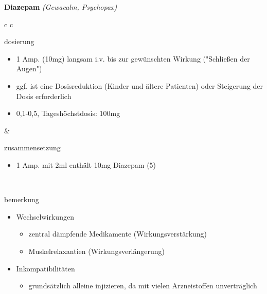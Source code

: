 \begin{frame}{
    \textbf{Diazepam}
    \textit{(Gewacalm, Psychopax)}
}
    \begin{tabular}{c c}
        \begin{beamercolorbox}[wd=\boxwidth\textwidth,ht=\boxheight\textheight,sep=1em]{dosierung}
            \begin{itemize}
                \item 1 Amp. (10mg) langsam i.v. bis zur gewünschten Wirkung ("Schließen der Augen")
                \item ggf. ist eine Dosisreduktion (Kinder und ältere Patienten) oder Steigerung der Dosis erforderlich
                \item 0,1-0,5\mgkgkg, Tageshöchstdosis: 100mg
            \end{itemize}
        \end{beamercolorbox} & 
        \begin{beamercolorbox}[wd=\boxwidth\textwidth,ht=\boxheight\textheight,sep=1em]{zusammensetzung}
            \begin{itemize}
                \item 1 Amp. mit 2ml enthält 10mg Diazepam (5\mgml)
            \end{itemize}
        \end{beamercolorbox} \\
        \begin{beamercolorbox}[wd=\textwidth,ht=\boxheight\textheight,sep=1em]{bemerkung}
            \begin{itemize}
                \item {
                    Wechselwirkungen
                    \begin{itemize}
                        \item zentral dämpfende Medikamente (Wirkungsverstärkung)
                        \item Muskelrelaxantien (Wirkungsverlängerung)
                    \end{itemize}
                }
                \item {
                    Inkompatibilitäten
                    \begin{itemize}
                        \item grundsätzlich alleine injizieren, da mit vielen Arzneistoffen unverträglich
                    \end{itemize}
                }
            \end{itemize}
        \end{beamercolorbox} \\
    \end{tabular}
\end{frame}

